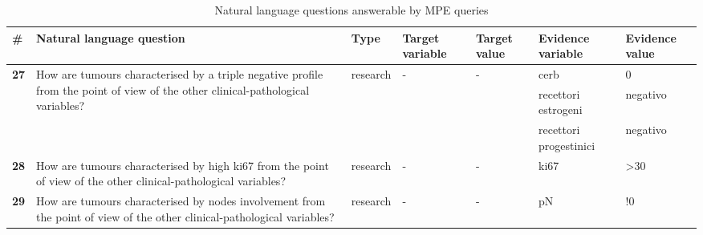 \begin{sidewaystable}[h]
	\centering
	\caption{Natural language questions answerable by MPE queries}
	\begin{tabularx}{\textwidth}{lXllllX}
		\toprule
		\textbf{\#} & Natural language question & Type  & Target variable & Target value & Evidence variable & Evidence value \\
		\midrule
		\multirow{3}[0]{*}{\textbf{27}} & \multirow{3}[0]{4cm}{How are tumours characterised by a triple negative profile from the point of view of the other clinical-pathological variables?} & \multirow{3}[0]{*}{research} & \multirow{3}[0]{*}{-} & \multirow{3}[0]{*}{-} & cerb  & 0 \\
		\addlinespace[9ex]
	      &       &       &       &       & recettori estrogeni & negativo \\
	      &       &       &       &       & recettori progestinici & negativo \\
		\textbf{28} & How are tumours characterised by high ki67 from the point of view of the other clinical-pathological variables? & research & -     & -     & ki67  & >30 \\
		\addlinespace[2ex]
		\textbf{29} & How are tumours characterised by nodes involvement from the point of view of the other clinical-pathological variables? & research & -     & -     & pN    & !0 \\
		\end{tabularx}
	\label{app:mpe}
\end{sidewaystable}


